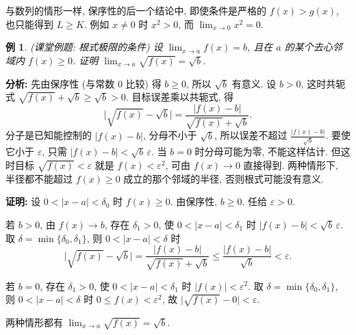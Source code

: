 \documentclass[UTF8,openany]{ctexbook}
\theoremstyle{chinesetextbook}
\newtheorem{example}{例}[section]
\newenvironment{cnproof}{\par\indent\textbf{证明:} \ignorespaces}{\par}
\begin{document}
与数列的情形一样, 保序性的后一个结论中, 即使条件是严格的 $f(x)>g(x)$, 也只能得到 $L\ge K$. 例如 $x\ne0$ 时 $x^2>0$, 而 $\displaystyle\lim_{x\to0}x^2=0$.
\begin{example}\label{ex:k16-1}
\textnormal{(课堂例题: 根式极限的条件)} 设 $\displaystyle\lim_{x\to a}f(x)=b$, 且在 $a$ 的某个去心邻域内 $f(x)\ge0$. 证明 $\displaystyle\lim_{x\to a}\sqrt{f(x)}=\sqrt b$.
\end{example}
\par\indent\textbf{分析:} 先由保序性 (与常数 $0$ 比较) 得 $b\ge0$, 所以 $\sqrt b$ 有意义. 设 $b>0$, 这时共轭式 $\sqrt{f(x)}+\sqrt b\ge\sqrt b>0$. 目标误差乘以共轭式, 得
\[
\bigl|\sqrt{f(x)}-\sqrt b\bigr|=\frac{|f(x)-b|}{\sqrt{f(x)}+\sqrt b}.
\]
分子是已知能控制的 $|f(x)-b|$, 分母不小于 $\sqrt b$, 所以误差不超过 $\displaystyle\frac{|f(x)-b|}{\sqrt b}$. 要使它小于 $\varepsilon$, 只需 $|f(x)-b|<\sqrt b\,\varepsilon$. 当 $b=0$ 时分母可能为零, 不能这样估计. 但这时目标 $\sqrt{f(x)}<\varepsilon$ 就是 $f(x)<\varepsilon^2$, 可由 $f(x)\to0$ 直接得到. 两种情形下, 半径都不能超过 $f(x)\ge0$ 成立的那个邻域的半径, 否则根式可能没有意义.
\begin{cnproof}
设 $0<|x-a|<\delta_0$ 时 $f(x)\ge0$. 由保序性, $b\ge0$. 任给 $\varepsilon>0$.

若 $b>0$, 由 $f(x)\to b$, 存在 $\delta_1>0$, 使 $0<|x-a|<\delta_1$ 时 $|f(x)-b|<\sqrt b\,\varepsilon$. 取 $\delta=\min\{\delta_0,\delta_1\}$, 则 $0<|x-a|<\delta$ 时
\[
\bigl|\sqrt{f(x)}-\sqrt b\bigr|=\frac{|f(x)-b|}{\sqrt{f(x)}+\sqrt b}\le\frac{|f(x)-b|}{\sqrt b}<\varepsilon.
\]

若 $b=0$, 存在 $\delta_1>0$, 使 $0<|x-a|<\delta_1$ 时 $|f(x)|<\varepsilon^2$. 取 $\delta=\min\{\delta_0,\delta_1\}$, 则 $0<|x-a|<\delta$ 时 $0\le f(x)<\varepsilon^2$, 故 $\bigl|\sqrt{f(x)}-0\bigr|<\varepsilon$.

两种情形都有 $\displaystyle\lim_{x\to a}\sqrt{f(x)}=\sqrt b$.
\end{cnproof}
\end{document}
